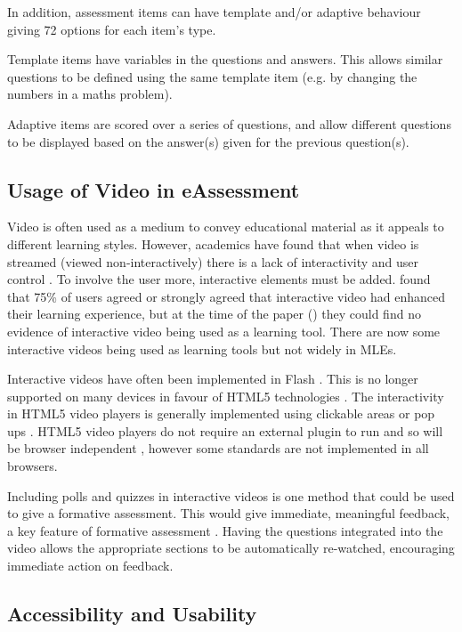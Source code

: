 In addition, assessment items can have template and/or adaptive behaviour giving 72 options for each item's type.

Template items have variables in the questions and answers. This allows similar questions to be defined using the same template item (e.g. by changing the numbers in a maths problem).

Adaptive items are scored over a series of questions, and allow different questions to be displayed based on the answer(s) given for the previous question(s).

\subsection{Usage of Video in eAssessment}
\label{Subsection:Usage of Video in eAssessment}
Video is often used as a medium to convey educational material as it appeals to different learning styles. However, academics have found that when video is streamed (viewed non-interactively) there is a lack of interactivity and user control \citep{eps267281, DeBoer}. To involve the user more, interactive elements must be added.  \citep{eps267281} found that 75\% of users agreed or strongly agreed that interactive video had enhanced their learning experience, but at the time of the paper (\citeyear{eps267281}) they could find no evidence of interactive video being used as a learning tool. There are now some interactive videos being used as learning tools \citep{nadia} but not widely in \glspl{MLE}.

Interactive videos have often been implemented in Flash \citep{eps267281, interactiveVideo}. This is no longer supported on many devices in favour of \gls{HTML5} technologies \citep{flashDead}. The interactivity in \gls{HTML5} video players is generally implemented using clickable areas or pop ups \citep{interactiveHTML5}. \gls{HTML5} video players do not require an external plugin to run and so will be browser independent \citep{epifania2011design, interactiveHTML5}, however some standards are not implemented in all browsers.

Including polls and quizzes in interactive videos is one method that could be used to give a formative assessment. This would give immediate, meaningful feedback, a key feature of formative assessment \citep{eps265979}. Having the questions integrated into the video allows the appropriate sections to be automatically re-watched, encouraging immediate action on feedback.

\subsection{Accessibility and Usability}
\label{Subsection:Accessibility and Usability}

